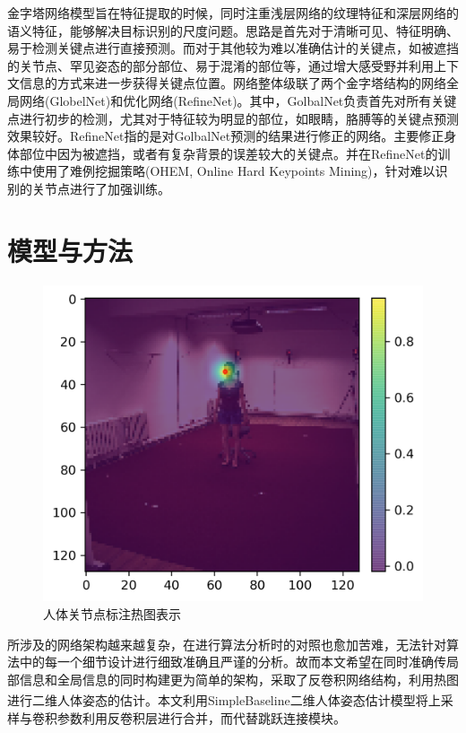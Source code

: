 金字塔网络模型旨在特征提取的时候，同时注重浅层网络的纹理特征和深层网络的语义特征，能够解决目标识别的尺度问题。思路是首先对于清晰可见、特征明确、易于检测关键点进行直接预测。而对于其他较为难以准确估计的关键点，如被遮挡的关节点、罕见姿态的部分部位、易于混淆的部位等，通过增大感受野并利用上下文信息的方式来进一步获得关键点位置。网络整体级联了两个金字塔结构的网络全局网络(GlobelNet)和优化网络(RefineNet)。其中，GolbalNet负责首先对所有关键点进行初步的检测，尤其对于特征较为明显的部位，如眼睛，胳膊等的关键点预测效果较好。RefineNet指的是对GolbalNet预测的结果进行修正的网络。主要修正身体部位中因为被遮挡，或者有复杂背景的误差较大的关键点。并在RefineNet的训练中使用了难例挖掘策略(OHEM, Online Hard Keypoints Mining)，针对难以识别的关节点进行了加强训练。


\section{模型与方法}

\begin{figure}[h]
	\centering
	\includegraphics[scale=0.4]{figures/18.png}
	\caption{人体关节点标注热图表示}
	\label{fig:f18}
\end{figure}

所涉及的网络架构越来越复杂，在进行算法分析时的对照也愈加苦难，无法针对算法中的每一个细节设计进行细致准确且严谨的分析。故而本文希望在同时准确传局部信息和全局信息的同时构建更为简单的架构，采取了反卷积网络结构，利用热图进行二维人体姿态的估计。本文利用SimpleBaseline二维人体姿态估计模型\textsuperscript{\cite{p25}}将上采样与卷积参数利用反卷积层进行合并，而代替跳跃连接模块。

